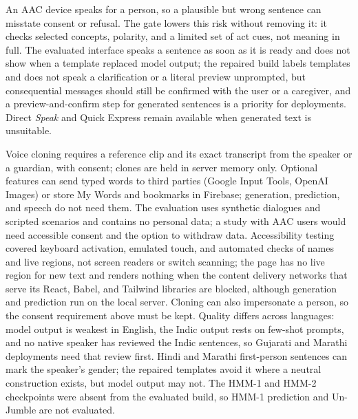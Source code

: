 An AAC device speaks for a person, so a plausible but wrong sentence can misstate consent or refusal.
The gate lowers this risk without removing it: it checks selected concepts, polarity, and a limited set of act cues, not meaning in full.
The evaluated interface speaks a sentence as soon as it is ready and does not show when a template replaced model output; the repaired build labels templates and does not speak a clarification or a literal preview unprompted, but consequential messages should still be confirmed with the user or a caregiver, and a preview-and-confirm step for generated sentences is a priority for deployments.
Direct \emph{Speak} and Quick Express remain available when generated text is unsuitable.

Voice cloning requires a reference clip and its exact transcript from the speaker or a guardian, with consent; clones are held in server memory only.
Optional features can send typed words to third parties (Google Input Tools, OpenAI Images) or store My Words and bookmarks in Firebase; generation, prediction, and speech do not need them.
The evaluation uses synthetic dialogues and scripted scenarios and contains no personal data; a study with AAC users would need accessible consent and the option to withdraw data.
Accessibility testing covered keyboard activation, emulated touch, and automated checks of names and live regions, not screen readers or switch scanning; the page has no live region for new text and renders nothing when the content delivery networks that serve its React, Babel, and Tailwind libraries are blocked, although generation and prediction run on the local server.
Cloning can also impersonate a person, so the consent requirement above must be kept.
Quality differs across languages: model output is weakest in English, the Indic output rests on few-shot prompts, and no native speaker has reviewed the Indic sentences, so Gujarati and Marathi deployments need that review first.
Hindi and Marathi first-person sentences can mark the speaker's gender; the repaired templates avoid it where a neutral construction exists, but model output may not.
The HMM-1 and HMM-2 checkpoints were absent from the evaluated build, so HMM-1 prediction and Un-Jumble are not evaluated.
